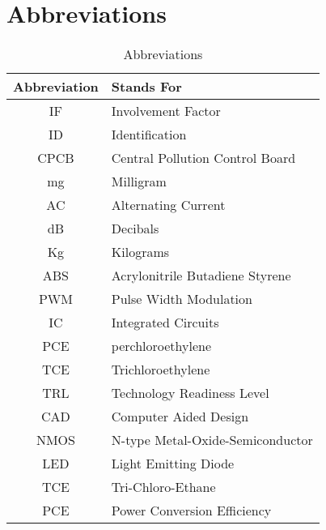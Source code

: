 \documentclass[table,french,english]{rapportCS}
\begin{document}
\listoffigures

\newpage
\pagestyle{plain}
\section*{Abbreviations}\label{sec:abbrevations}
   \begin{table}[h]
      \centering
      \begin{tabular}{|c|>{\centering\arraybackslash}p{8cm}|}
        \hline
        \textbf{Abbreviation} & \textbf{Stands For} \\
        \hline
        IF & Involvement Factor \\
        \hline
        ID & Identification \\
        \hline
        CPCB & Central Pollution Control Board \\
        \hline
        mg & Milligram \\
        \hline
        AC & Alternating Current \\
        \hline
        dB & Decibals \\
        \hline
        Kg & Kilograms \\
        \hline
        ABS & Acrylonitrile Butadiene Styrene \\
        \hline
        PWM & Pulse Width Modulation \\
        \hline
        IC & Integrated Circuits \\
        \hline
        PCE & perchloroethylene \\
        \hline
        TCE & Trichloroethylene \\
        \hline
        TRL & Technology Readiness Level \\
        \hline
        CAD & Computer Aided Design \\
        \hline
        NMOS & N-type Metal-Oxide-Semiconductor
 \\
        \hline
        LED & Light Emitting Diode \\
        \hline
        TCE & Tri-Chloro-Ethane \\
        \hline
        PCE & Power Conversion Efficiency \\
        \hline
      \end{tabular}
      \caption{Abbreviations}
      \label{tab:abbreviations}
    \end{table}
\end{document}
